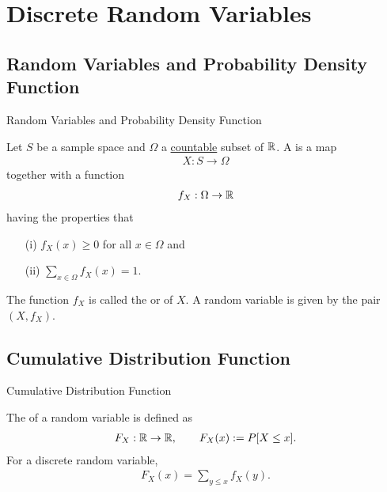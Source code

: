 \section{Discrete Random Variables}

\subsection{Random Variables and Probability Density Function}

\begin{frame}{Random Variables and Probability Density Function}

\justifying
{} Let $S$ be a sample space and $\Omega$ a \underline{countable} subset of $\mathbb{R}$. A  is a map
\begin{align*}
X: S\rightarrow \Omega
\end{align*}
together with a function
\begin{align*}
f_X: \Omega \rightarrow \mathbb{R}
\end{align*}
having the properties that
\begin{itemize}
	\item[(i)] $f_X(x) \geq 0$ for all $x\in \Omega$ and
	\item[(ii)] $\displaystyle \sum_{x\in \Omega} f_X(x) = 1$.
\end{itemize}
The function $f_X$ is called the  or  of $X$. A random variable is given by the pair $(X, f_X)$.

\end{frame}


\subsection{Cumulative Distribution Function}

\begin{frame}{Cumulative Distribution Function}

\justifying
{} The  of a random variable is defined as
\begin{align*}
F_X: \mathbb{R}\rightarrow \mathbb{R}, \qquad F_X(x) := P[X\leq x].
\end{align*}
For a discrete random variable,
\begin{align*}
F_X(x) = \sum_{y\leq x} f_X(y).
\end{align*}

\end{frame}

